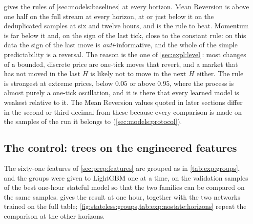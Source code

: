  gives the rules of \cref{sec:models:baselines} at every horizon.
Mean Reversion is above one half on the full stream at every horizon, at or just below it
on the deduplicated samples at six and twelve hours, and is the rule to beat.  Momentum is far below
it and, on the sign of the last tick, close to the constant rule: on this data the sign of
the last move is \emph{anti}-informative, and the whole of the simple predictability is a
reversal.  The reason is the one of \cref{sec:expl:level}: most changes of a bounded,
discrete price are one-tick moves that revert, and a market that has not moved in the last
$H$ is likely not to move in the next $H$ either.  The rule is strongest at extreme prices,
below $0.05$ or above $0.95$, where the process is almost purely a one-tick oscillation,
and it is there that every learned model is weakest relative to it.  The Mean Reversion
values quoted in later sections differ in the second or third decimal from these because every
comparison is made on the samples of the run it belongs to (\cref{sec:models:protocol}).

\subsection{The control: trees on the engineered features}
\label{sec:stateless:control}
\label{sec:exp:nostate}

The sixty-one features of \cref{sec:prep:features} are grouped as in \cref{tab:exp:groups},
and the groups were given to LightGBM one at a time, on the validation samples of the best
one-hour stateful model so that the two families can be compared on the same samples.
 gives the result at one hour, together with the two networks trained
on the full table; \cref{fig:stateless:groups,tab:exp:nostate:horizons} repeat the
comparison at the other horizons.

